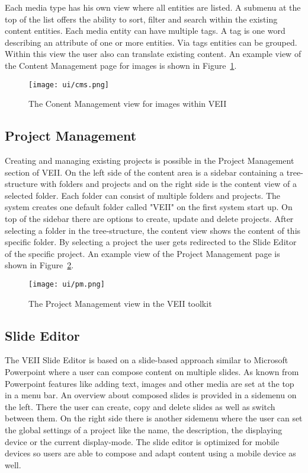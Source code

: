 Each media type has his own view where all entities are listed. A submenu at the top of the list offers the ability to sort, filter and search within the existing content entities. Each media entity can have multiple tags. A tag is one word describing an attribute of one or more entities. Via tags entities can be grouped. Within this view the user also can translate existing content. An example view of the Content Management page for images is shown in Figure~\ref{fig:cms}.

\begin{figure}
  \begin{center}
    \texttt{[image: ui/cms.png]}
    \caption{The Conent Management view for images within VEII}
    \label{fig:cms}
  \end{center}
\end{figure}

\subsection{Project Management}
Creating and managing existing projects is possible in the Project Management section of VEII. On the left side of the content area is a sidebar containing a tree-structure with folders and projects and on the right side is the content view of a selected folder. Each folder can consist of multiple folders and projects. The system creates one default folder called "VEII" on the first system start up. On top of the sidebar there are options to create, update and delete projects. After selecting a folder in the tree-structure, the content view shows the content of this specific folder. By selecting a project the user gets redirected to the Slide Editor of the specific project. An example view of the Project Management page is shown in Figure~\ref{fig:pm}.

\begin{figure}
  \begin{center}
    \texttt{[image: ui/pm.png]}
    \caption{The Project Management view in the VEII toolkit}
    \label{fig:pm}
  \end{center}
\end{figure}

\subsection{Slide Editor}
The VEII Slide Editor is based on a slide-based approach similar to Microsoft Powerpoint where a user can compose content on multiple slides. As known from Powerpoint features like adding text, images and other media are set at the top in a menu bar. An overview about composed slides is provided in a sidemenu on the left. There the user can create, copy and delete slides as well as switch between them. On the right side there is another sidemenu where the user can set the global settings of a project like the name, the description, the displaying device or the current display-mode. The slide editor is optimized for mobile devices so users are able to compose and adapt content using a mobile device as well. 

